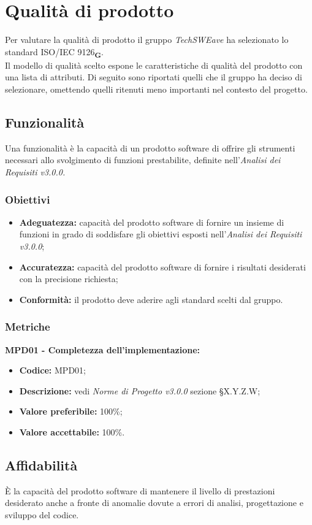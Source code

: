 \section{Qualità di prodotto}
Per valutare la qualità di prodotto il gruppo  \textit{TechSWEave} ha selezionato lo standard ISO/IEC 9126\textsubscript{\textbf{G}}.\\
Il modello di qualità scelto espone le caratteristiche di qualità del prodotto con una lista di attributi. Di seguito sono riportati quelli che il
gruppo ha deciso di selezionare, omettendo quelli ritenuti meno importanti nel contesto del progetto.
\subsection{Funzionalità}
Una funzionalità è la capacità di un prodotto software di offrire gli strumenti necessari allo svolgimento di funzioni prestabilite, definite
nell'\textit{Analisi dei Requisiti v3.0.0.}
\subsubsection{Obiettivi}
\begin{itemize}
    \item \textbf{Adeguatezza:} capacità del prodotto software di fornire un insieme di funzioni in grado
          di soddisfare gli obiettivi esposti nell’\textit{Analisi dei Requisiti v3.0.0};
    \item \textbf{Accuratezza:} capacità del prodotto software di fornire i risultati desiderati con la precisione richiesta;
    \item \textbf{Conformità:} il prodotto deve aderire agli standard scelti dal gruppo.
\end{itemize}
\subsubsection{Metriche}
\textbf{MPD01 - Completezza dell'implementazione:}
\begin{itemize}
    \item \textbf{Codice:} MPD01;
    \item \textbf{Descrizione:} vedi \textit{Norme di Progetto v3.0.0} sezione \S X.Y.Z.W;
    \item \textbf{Valore preferibile:} 100\%;
    \item \textbf{Valore accettabile:} 100\%.
\end{itemize}
\subsection{Affidabilità}
È la capacità del prodotto software di mantenere il livello di prestazioni
desiderato anche a fronte di anomalie dovute a errori di analisi, progettazione e sviluppo del codice.
